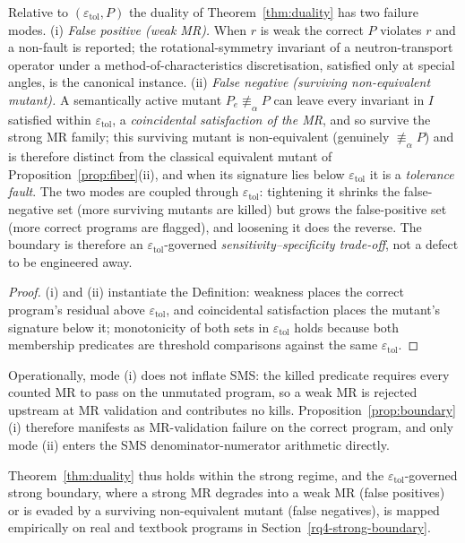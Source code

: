 \documentclass[manuscript,screen,review]{acmart}
\begin{document}
\begin{proposition}\label{prop:boundary}
Relative to
$(\varepsilon_{\mathrm{tol}}, P)$ the duality of Theorem~\ref{thm:duality} has two
failure modes. (i) \emph{False positive (weak MR).} When $r$ is weak the
correct $P$ violates $r$ and a non-fault is reported; the
rotational-symmetry invariant of a neutron-transport operator under a
method-of-characteristics discretisation, satisfied only at special
angles, is the canonical instance. (ii) \emph{False negative (surviving
non-equivalent mutant).} A semantically active mutant
$P_e \not\equiv_\alpha P$ can leave every invariant in $I$ satisfied
within $\varepsilon_{\mathrm{tol}}$, a \emph{coincidental satisfaction
of the MR}, and so survive the strong MR family; this surviving mutant
is non-equivalent (genuinely $\not\equiv_\alpha P$) and is therefore
distinct from the classical equivalent mutant of Proposition~\ref{prop:fiber}(ii), and
when its signature lies below $\varepsilon_{\mathrm{tol}}$ it is a
\emph{tolerance fault}. The two modes are coupled through
$\varepsilon_{\mathrm{tol}}$: tightening it shrinks the false-negative
set (more surviving mutants are killed) but grows the false-positive set
(more correct programs are flagged), and loosening it does the reverse.
The boundary is therefore an $\varepsilon_{\mathrm{tol}}$-governed
\emph{sensitivity--specificity trade-off}, not a defect to be engineered
away.
\end{proposition}

\begin{proof}
(i) and (ii) instantiate the Definition: weakness
places the correct program's residual above $\varepsilon_{\mathrm{tol}}$,
and coincidental satisfaction places the mutant's signature below it;
monotonicity of both sets in $\varepsilon_{\mathrm{tol}}$ holds because
both membership predicates are threshold comparisons against the same
$\varepsilon_{\mathrm{tol}}$.
\end{proof}

Operationally, mode (i) does not inflate SMS: the killed predicate
requires every counted MR to pass on the unmutated program, so a weak
MR is rejected upstream at MR validation and contributes no kills.
Proposition~\ref{prop:boundary}(i) therefore manifests as
MR-validation failure on the correct program, and only mode (ii)
enters the SMS denominator-numerator arithmetic directly.

Theorem~\ref{thm:duality} thus holds within the strong regime, and the
$\varepsilon_{\mathrm{tol}}$-governed strong boundary, where a strong
MR degrades into a weak MR (false positives) or is evaded by a surviving
non-equivalent mutant (false negatives), is mapped empirically on real
and textbook programs in Section~\ref{rq4-strong-boundary}.
\end{document}
